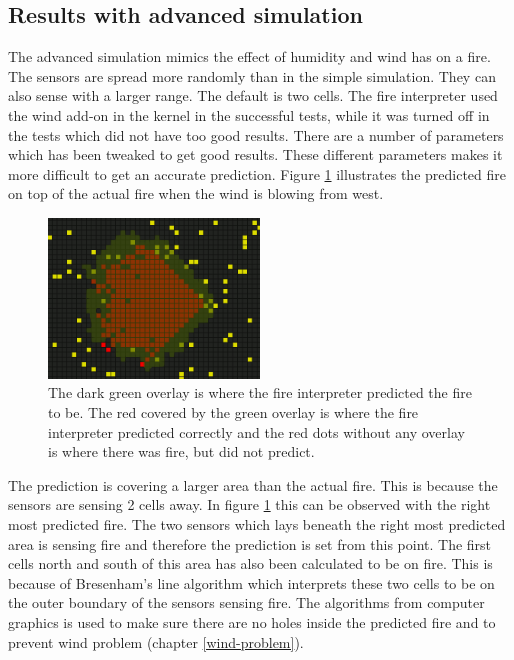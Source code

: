 \subsection{Results with advanced simulation}
The advanced simulation mimics the effect of humidity and wind has on a fire. The sensors are spread more randomly than in the simple simulation. They can also sense with a larger range. The default is two cells. The fire interpreter used the wind add-on in the kernel in the successful tests, while it was turned off in the tests which did not have too good results. There are a number of parameters which has been tweaked to get good results. These different parameters makes it more difficult to get an accurate prediction. Figure \ref{fig:wind-advanced-bresenham-large} illustrates the predicted fire on top of the actual fire when the wind is blowing from west.  
\begin{figure}[here]
  \centering
      \includegraphics[width=0.5\textwidth]{discussion/graphics/wind-advanced-bresenham-large.png}
  \caption{The dark green overlay is where the fire interpreter predicted the fire to be. The red covered by the green overlay is where the fire interpreter predicted correctly and the red dots without any overlay is where there was fire, but did not predict.}
  \label{fig:wind-advanced-bresenham-large}
\end{figure}
The prediction is covering a larger area than the actual fire. This is because the sensors are sensing 2 cells away. In figure \ref{fig:wind-advanced-bresenham-large} this can be observed with the right most predicted fire. The two sensors which lays beneath the right most predicted area is sensing fire and therefore the prediction is set from this point. The first cells north and south of this area has also been calculated to be on fire. This is because of Bresenham’s line algorithm which interprets these two cells to be on the outer boundary of the sensors sensing fire. The algorithms from computer graphics is used to make sure there are no holes inside the predicted fire and to prevent wind problem (chapter \ref{wind-problem}).
